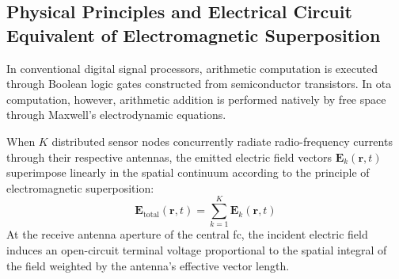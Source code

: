\documentclass[Markos_Delaportas_1316.tex]{subfiles}
\begin{document}
\subsection{Physical Principles and Electrical Circuit Equivalent of
Electromagnetic Superposition}
\label{subsec:physical_circuit_superposition}
In conventional digital signal processors, arithmetic computation is
executed through Boolean logic
gates constructed from semiconductor transistors. In \gls{ota}
computation, however, arithmetic addition
is performed natively by free space through Maxwell's electrodynamic equations.

When $K$ distributed sensor nodes concurrently radiate
radio-frequency currents through their respective
antennas, the emitted electric field vectors
$\mathbf{E}_k(\mathbf{r}, t)$ superimpose linearly in the
spatial continuum according to the principle of electromagnetic superposition:
\begin{equation}
    \mathbf{E}_{\text{total}}(\mathbf{r}, t) = \sum_{k=1}^{K}
    \mathbf{E}_k(\mathbf{r}, t)
    \label{eq:maxwell_superposition}
\end{equation}
At the receive antenna aperture of the central \gls{fc}, the incident
electric field induces an open-circuit
terminal voltage proportional to the spatial integral of the field
weighted by the antenna's effective vector length.
\end{document}
